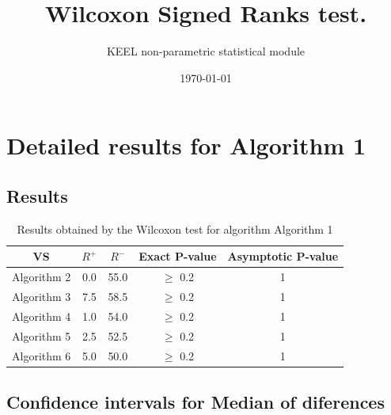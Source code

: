 \documentclass[a4paper,10pt]{article}
\title{Wilcoxon Signed Ranks test.}
\date{\today}
\author{KEEL non-parametric statistical module}
\begin{document}
\pagestyle{empty}
\maketitle
\thispagestyle{empty}



\section{Detailed results for Algorithm 1}


\subsection{Results}

\begin{table}[!htp]
\centering\small
\begin{tabular}{
|c|c|c|c|c|}
\hline
 VS & $R^{+}$ & $R^{-}$ & Exact P-value & Asymptotic P-value \\ \hline 
Algorithm 2 & 0.0 & 55.0 & $\geq$ 0.2 & 1\\ \hline 
Algorithm 3 & 7.5 & 58.5 & $\geq$ 0.2 & 1\\ \hline 
Algorithm 4 & 1.0 & 54.0 & $\geq$ 0.2 & 1\\ \hline 
Algorithm 5 & 2.5 & 52.5 & $\geq$ 0.2 & 1\\ \hline 
Algorithm 6 & 5.0 & 50.0 & $\geq$ 0.2 & 1\\ \hline 

\end{tabular}
\caption{Results obtained by the Wilcoxon test for algorithm Algorithm 1}
\end{table}

\subsection{Confidence intervals for Median of diferences}
\end{document}
